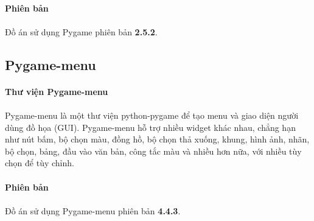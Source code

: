 \paragraph{Phiên bản}
\paragraph{}{Đồ án sử dụng Pygame phiên bản \textbf{2.5.2}.}

\subsection{Pygame-menu} 

\paragraph{Thư viện Pygame-menu} \cite{pygame-menu}
\paragraph{}{Pygame-menu là một thư viện python-pygame để tạo menu và giao diện người dùng đồ họa (GUI). Pygame-menu hỗ trợ nhiều widget khác nhau, chẳng hạn như nút bấm, bộ chọn màu, đồng hồ, bộ chọn thả xuống, khung, hình ảnh, nhãn, bộ chọn, bảng, đầu vào văn bản, công tắc màu và nhiều hơn nữa, với nhiều tùy chọn để tùy chỉnh.}

\paragraph{Phiên bản}
\paragraph{}{Đồ án sử dụng Pygame-menu phiên bản \textbf{4.4.3}.}
